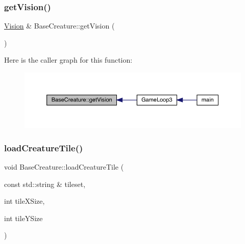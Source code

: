 \subsubsection{\texorpdfstring{get\+Vision()}{getVision()}}
{\footnotesize\ttfamily \mbox{\hyperlink{class_vision}{Vision}} \& Base\+Creature\+::get\+Vision (\begin{DoxyParamCaption}{ }\end{DoxyParamCaption})}

Here is the caller graph for this function\+:
\nopagebreak
\begin{figure}[H]
\begin{center}
\leavevmode
\includegraphics[width=350pt]{d2/d3b/class_base_creature_a8a960bc7a7689f5633b1abaa82fa6e95_icgraph}
\end{center}
\end{figure}
\mbox{\label{class_base_creature_af2066b8eb62bf595d30feae6671e4495}} 
\subsubsection{\texorpdfstring{load\+Creature\+Tile()}{loadCreatureTile()}}
{\footnotesize\ttfamily void Base\+Creature\+::load\+Creature\+Tile (\begin{DoxyParamCaption}\item[{const std\+::string \&}]{tileset,  }\item[{int}]{tile\+X\+Size,  }\item[{int}]{tile\+Y\+Size }\end{DoxyParamCaption})}

